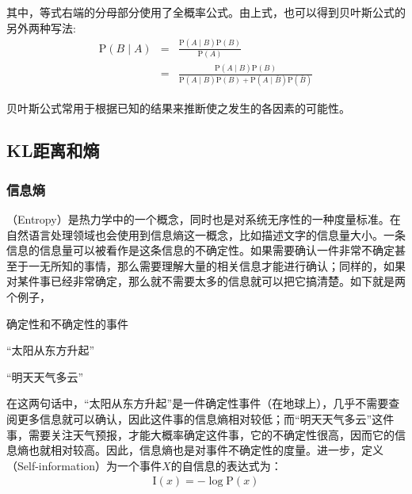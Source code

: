 \noindent 其中，等式右端的分母部分使用了全概率公式。由上式，也可以得到贝叶斯公式的另外两种写法:
\begin{eqnarray}
\textrm{P}(B \mid A) & = & \frac { \textrm{P}(A \mid B)\textrm{P}(B) }  {\textrm{P}(A)} \nonumber \\
                     & = & \frac { \textrm{P}(A \mid B)\textrm{P}(B) }  {\textrm{P}(A \mid B)\textrm{P}(B)+\textrm{P}(A \mid \bar{B}) \textrm{P}(\bar{B})}
\label{eq:2-12}
\end{eqnarray}

\parinterval 贝叶斯公式常用于根据已知的结果来推断使之发生的各因素的可能性。


\subsection{KL距离和熵}


\subsubsection{信息熵}

（Entropy）是热力学中的一个概念，同时也是对系统无序性的一种度量标准。在自然语言处理领域也会使用到信息熵这一概念，比如描述文字的信息量大小。一条信息的信息量可以被看作是这条信息的不确定性。如果需要确认一件非常不确定甚至于一无所知的事情，那么需要理解大量的相关信息才能进行确认；同样的，如果对某件事已经非常确定，那么就不需要太多的信息就可以把它搞清楚。如下就是两个例子，

\begin{example}
确定性和不确定性的事件

\qquad\qquad\quad``太阳从东方升起''

\qquad\qquad\quad``明天天气多云''
\label{eg:2-1}
\end{example}

\parinterval 在这两句话中，``太阳从东方升起''是一件确定性事件（在地球上），几乎不需要查阅更多信息就可以确认，因此这件事的信息熵相对较低；而``明天天气多云''这件事，需要关注天气预报，才能大概率确定这件事，它的不确定性很高，因而它的信息熵也就相对较高。因此，信息熵也是对事件不确定性的度量。进一步，定义{\small{}}（Self-information）为一个事件$X$的自信息的表达式为：
\begin{eqnarray}
\textrm{I}(x)=-\log\textrm{P}(x)
\label{eq:2-13}
\end{eqnarray}

